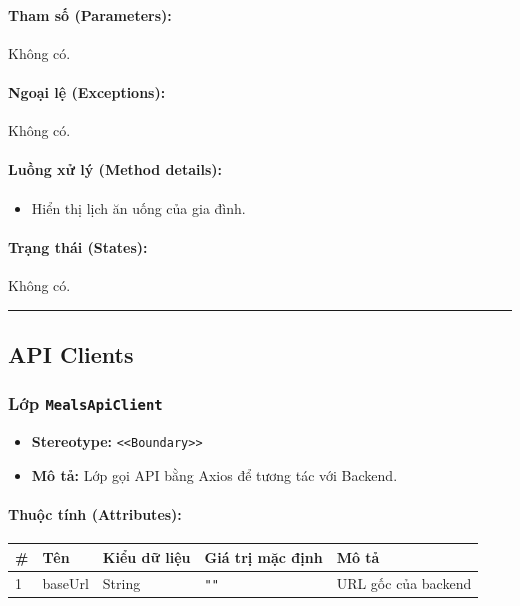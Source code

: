 \documentclass[12pt,a4paper]{article}
\begin{document}
\paragraph{Tham số (Parameters):}
Không có.

\paragraph{Ngoại lệ (Exceptions):}
Không có.

\paragraph{Luồng xử lý (Method details):}
\begin{itemize}[leftmargin=*]
    \item Hiển thị lịch ăn uống của gia đình.
\end{itemize}


\paragraph{Trạng thái (States):}
Không có.

\vskip 0.5cm
\noindent\rule{\textwidth}{0.5pt}
\vskip 0.5cm

\subsection{API Clients}


\subsubsection{Lớp \texttt{MealsApiClient}}

\begin{itemize}[leftmargin=*]
    \item \textbf{Stereotype:} \texttt{\textless{}\textless{}Boundary\textgreater{}\textgreater{}}
    \item \textbf{Mô tả:} Lớp gọi API bằng Axios để tương tác với Backend.
\end{itemize}

\paragraph{Thuộc tính (Attributes):}
\begin{longtable}{|p{0.6cm}|p{3.5cm}|p{2.4cm}|p{1.8cm}|p{5.1cm}|}
\hline
\textbf{\#} & \textbf{Tên} & \textbf{Kiểu dữ liệu} & \textbf{Giá trị mặc định} & \textbf{Mô tả} \\ \hline
\endhead
1 & baseUrl & String & \texttt{""} & URL gốc của backend \\ \hline
\end{longtable}
\end{document}
